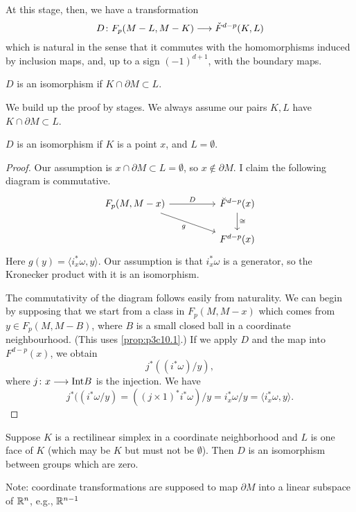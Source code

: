 \documentclass[../main]{subfiles}
\begin{document}
At this stage, then, we have a transformation
\[D \colon F_p(M-L,M-K) \longrightarrow \check{F}^{d-p}(K,L)\]
which is natural in the sense that it commutes with the homomorphisms induced by inclusion maps, and, up to a sign $(-1)^{d+1}$, with the boundary maps.
\begin{theorem}\label{thm:p3c10.6}
$D$ is an isomorphism if $K \cap \partial M \subset L$.
\end{theorem}
We build up the proof by stages. We always assume our pairs $K,L$ have $K \cap \partial M \subset L$.
\begin{remark}\label{rmk:p3c10.7}
$D$ is an isomorphism if $K$ is a point $x$, and $L = \emptyset$.
\end{remark}
\begin{proof}
Our assumption is $x \cap \partial M \subset L = \emptyset$, so $x \not\in \partial M$. I claim the following diagram is commutative.
\[
\begin{tikzcd}
{F_p(M, M - x)} \arrow[rrd, "g"'] \arrow[rr, "D"] &  & \breve F^{d - p}(x) \arrow[d, "\cong"] \\
                                                  &  & F^{d - p}(x)                          
\end{tikzcd}
\]
Here $g(y) = \langle i_x^* \omega, y \rangle$. Our assumption is that $i_x^* \omega$ is a generator, so the Kronecker product with it is an isomorphism.

The commutativity of the diagram follows easily from naturality. We can begin by supposing that we start from a class in $F_p(M,M-x)$ which comes from $y \in F_p(M,M-B)$, where $B$ is a small closed ball in a coordinate neighbourhood. (This uses \ref{prop:p3c10.1}.) If we apply $D$ and the map into $F^{d-p}(x)$, we obtain
\[j^*((i^* \omega)/y),\]
where $j \colon x \longrightarrow \mathrm{Int} B$ is the injection. We have
\[j^*((i^*\omega/y) = ((j \times 1)^* i^* \omega)/y = i_x^*\omega/y = \langle i_x^* \omega, y \rangle.\]
\end{proof}
\begin{remark}\label{rmk:p3c10.8}
Suppose $K$ is a rectilinear simplex in a coordinate neighborhood and $L$ is one face of $K$ (which may be $K$ but must not be $\emptyset$). Then $D$ is an isomorphism between groups which are zero.
\end{remark}
Note: coordinate transformations are supposed to map $\partial M$ into a linear subspace of $\mathbb{R}^n$, e.g., $\mathbb{R}^{n-1}$
\end{document}
